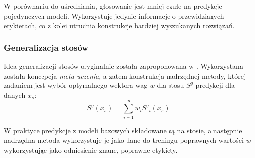 W porównaniu do uśredniania, głosowanie jest mniej czułe na predykcje pojedynczych modeli. Wykorzystuje jedynie informacje o przewidzianych etykietach, \linebreak co z kolei utrudnia konstrukcje bardziej wyszukanych rozwiązań.

\subsubsection{Generalizacja stosów}
Idea generalizacji stosów oryginalnie została zaproponowana w \cite{Wolpert92stackedgeneralization}. Wykorzystana została koncepcja \textit{meta-uczenia}, a zatem konstrukcja nadrzędnej metody, której zadaniem jest wybór optymalnego wektora wag $w$ dla stosu $S^g$ predykcji dla danych $x_s$:
\begin{equation}
S^g(x_s) = \sum_{i=1}^{m}w_i {S^g}_i(x_s)
\end{equation}

W praktyce predykcje z modeli bazowych składowane są na stosie, a następnie nadrzędna metoda wykorzystuje je jako dane do treningu poprawnych wartości $w$ wykorzystując jako odniesienie znane, poprawne etykiety.

    
